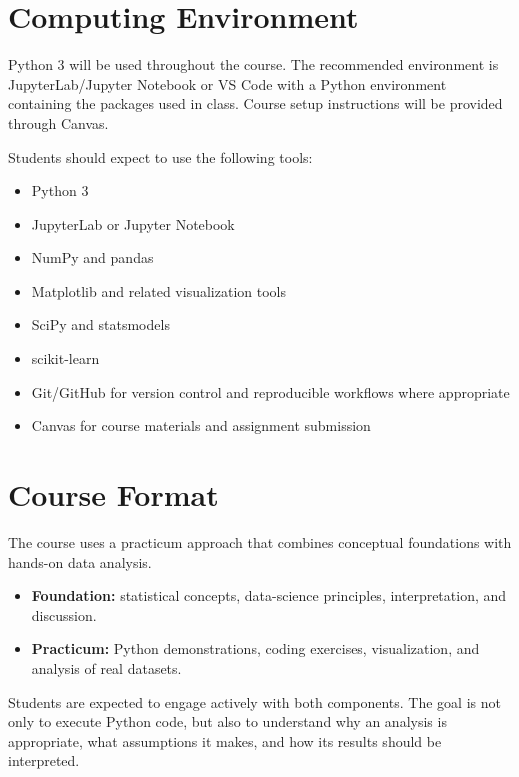 \documentclass[11pt]{article}
\begin{document}
\section{Computing Environment}

Python 3 will be used throughout the course. The recommended environment is JupyterLab/Jupyter Notebook or VS Code with a Python environment containing the packages used in class. Course setup instructions will be provided through Canvas.

Students should expect to use the following tools:

\begin{itemize}
  \item Python 3
  \item JupyterLab or Jupyter Notebook
  \item NumPy and pandas
  \item Matplotlib and related visualization tools
  \item SciPy and statsmodels
  \item scikit-learn
  \item Git/GitHub for version control and reproducible workflows where appropriate
  \item Canvas for course materials and assignment submission
\end{itemize}


\section{Course Format}

The course uses a practicum approach that combines conceptual foundations with hands-on data analysis.

\begin{itemize}
  \item \textbf{Foundation:} statistical concepts, data-science principles, interpretation, and discussion.
  \item \textbf{Practicum:} Python demonstrations, coding exercises, visualization, and analysis of real datasets.
\end{itemize}

Students are expected to engage actively with both components. The goal is not only to execute Python code, but also to understand why an analysis is appropriate, what assumptions it makes, and how its results should be interpreted.
\end{document}
